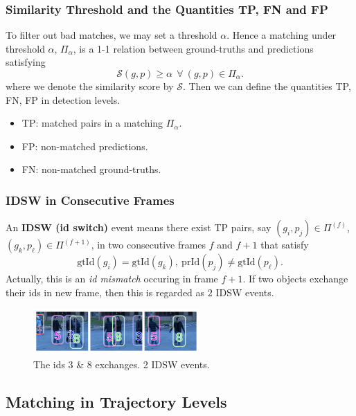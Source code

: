 \documentclass[slidetop, mathserif]{beamer}
\begin{document}
\begin{frame}
	\frametitle{Similarity Threshold and the Quantities TP, FN and FP}

	To filter out bad matches, we may set a threshold $\alpha$.
	Hence a matching under threshold $\alpha$, $\Pi_\alpha$, is a 1-1 relation between
	ground-truths and predictions satisfying
	\[
		\mathcal S(g,p) \geq \alpha~~ \forall\ (g, p) \in \Pi_\alpha.
	\]
	where we denote the similarity score by $\mathcal S$.
	Then we can define the quantities TP, FN, FP in detection levels.
	\begin{itemize}
	\item TP: matched pairs in a matching $\Pi_\alpha$.
	\item FP: non-matched predictions.
	\item FN: non-matched ground-truths.
	\end{itemize}
\end{frame}


\begin{frame}
	\frametitle{IDSW in Consecutive Frames}
	
	An {\bf IDSW (id switch)} event means there exist TP pairs, say $(g_i, p_j)\in\Pi^{(f)}$,
	$(g_k, p_\ell)\in\Pi^{(f+1)}$, in two consecutive frames
	$f$ and $f+1$ that satisfy
	\[
		\text{gtId}(g_i) = \text{gtId}(g_k),\ 
		\text{prId}(p_j) \neq \text{gtId}(p_\ell).
	\]
	Actually, this is an \emph{id mismatch} occuring in frame $f+1$.
	If two objects exchange their ids in new frame, then this is regarded as $2$
	IDSW events.
	\begin{figure}
		\includegraphics[width=180pt]{pics/fig3.png}
		\caption{The ids 3 \& 8 exchanges. 2 IDSW events.}
	\end{figure}
	    
\end{frame}

\subsection{Matching in Trajectory Levels}
\end{document}
